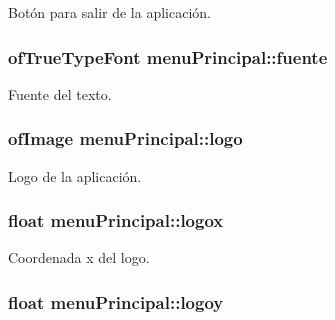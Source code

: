 Botón para salir de la aplicación. 

\hypertarget{classmenu_principal_a23f1de2b0d66522eae4ce63763d31ce6}{}
\subsubsection[{fuente}]{\setlength{\rightskip}{0pt plus 5cm}of\+True\+Type\+Font menu\+Principal\+::fuente\hspace{0.3cm}{\ttfamily [private]}}\label{classmenu_principal_a23f1de2b0d66522eae4ce63763d31ce6}


Fuente del texto. 

\hypertarget{classmenu_principal_aa5ec7fdf5031285aab08c58e0fecbd82}{}
\subsubsection[{logo}]{\setlength{\rightskip}{0pt plus 5cm}of\+Image menu\+Principal\+::logo\hspace{0.3cm}{\ttfamily [private]}}\label{classmenu_principal_aa5ec7fdf5031285aab08c58e0fecbd82}


Logo de la aplicación. 

\hypertarget{classmenu_principal_aca0ebae92aafb9026c9aace3e23463fb}{}
\subsubsection[{logox}]{\setlength{\rightskip}{0pt plus 5cm}float menu\+Principal\+::logox\hspace{0.3cm}{\ttfamily [private]}}\label{classmenu_principal_aca0ebae92aafb9026c9aace3e23463fb}


Coordenada x del logo. 

\hypertarget{classmenu_principal_a1f1f6764a1253e7fa12f9cee448f29b9}{}
\subsubsection[{logoy}]{\setlength{\rightskip}{0pt plus 5cm}float menu\+Principal\+::logoy\hspace{0.3cm}{\ttfamily [private]}}\label{classmenu_principal_a1f1f6764a1253e7fa12f9cee448f29b9}


